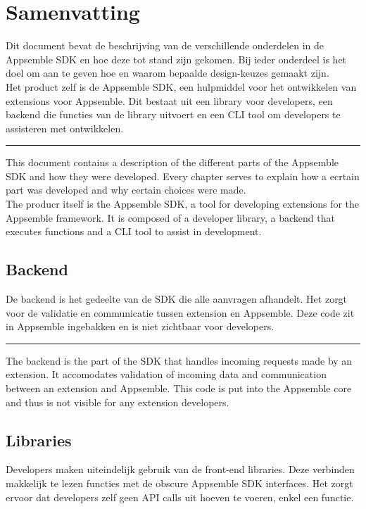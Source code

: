 \chapter{Samenvatting}

Dit document bevat de beschrijving van de verschillende onderdelen in de Appsemble SDK en hoe deze tot stand zijn gekomen. Bij ieder onderdeel is het doel om aan te geven hoe en waarom bepaalde design-keuzes gemaakt zijn. \\

Het product zelf is de Appsemble SDK, een hulpmiddel voor het ontwikkelen van extensions voor Appsemble. Dit bestaat uit een library voor developers, een backend die functies van de library uitvoert en een CLI tool om developers te assisteren met ontwikkelen.

\noindent\rule[0.5ex]{\linewidth}{1pt}

This document contains a description of the different parts of the Appsemble SDK and how they were developed. Every chapter serves to explain how a ecrtain part was developed and why certain choices were made. \\

The producr itself is the Appsemble SDK, a tool for developing extensions for the Appsemble framework. It is composed of a developer library, a backend that executes functions and a CLI tool to assist in development.

\section{Backend}

De backend is het gedeelte van de SDK die alle aanvragen afhandelt. Het zorgt voor de validatie en communicatie tussen extension en Appsemble. Deze code zit in Appsemble ingebakken en is niet zichtbaar voor developers. 

\noindent\rule[0.5ex]{\linewidth}{1pt}

The backend is the part of the SDK that handles incoming requests made by an extension. It accomodates validation of incoming data and communication between an extension and Appsemble. This code is put into the Appsemble core and thus is not visible for any extension developers.

\section{Libraries}

Developers maken uiteindelijk gebruik van de front-end libraries. Deze verbinden makkelijk te lezen functies met de obscure Appsemble SDK interfaces. Het zorgt ervoor dat developers zelf geen API calls uit hoeven te voeren, enkel een functie.

